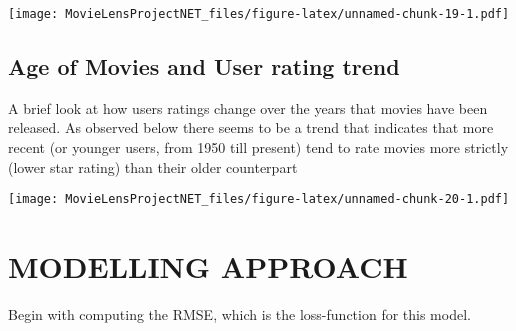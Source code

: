 \documentclass[
]{article}
\newenvironment{Shaded}{\begin{snugshade}}{\end{snugshade}}
\newcommand{\CommentTok}[1]{\textcolor[rgb]{0.56,0.35,0.01}{\textit{#1}}}
\newcommand{\DataTypeTok}[1]{\textcolor[rgb]{0.13,0.29,0.53}{#1}}
\newcommand{\DecValTok}[1]{\textcolor[rgb]{0.00,0.00,0.81}{#1}}
\newcommand{\KeywordTok}[1]{\textcolor[rgb]{0.13,0.29,0.53}{\textbf{#1}}}
\newcommand{\NormalTok}[1]{#1}
\newcommand{\OperatorTok}[1]{\textcolor[rgb]{0.81,0.36,0.00}{\textbf{#1}}}
\newcommand{\StringTok}[1]{\textcolor[rgb]{0.31,0.60,0.02}{#1}}
\begin{document}
\texttt{[image: MovieLensProjectNET\_files/figure-latex/unnamed-chunk-19-1.pdf]}

\hypertarget{age-of-movies-and-user-rating-trend}{%
\subsection{Age of Movies and User rating
trend}\label{age-of-movies-and-user-rating-trend}}

A brief look at how users ratings change over the years that movies have
been released. As observed below there seems to be a trend that
indicates that more recent (or younger users, from 1950 till present)
tend to rate movies more strictly (lower star rating) than their older
counterpart

\begin{Shaded}
\end{Shaded}

\texttt{[image: MovieLensProjectNET\_files/figure-latex/unnamed-chunk-20-1.pdf]}

\hypertarget{modelling-approach}{%
\section{MODELLING APPROACH}\label{modelling-approach}}

Begin with computing the RMSE, which is the loss-function for this
model.
\end{document}
